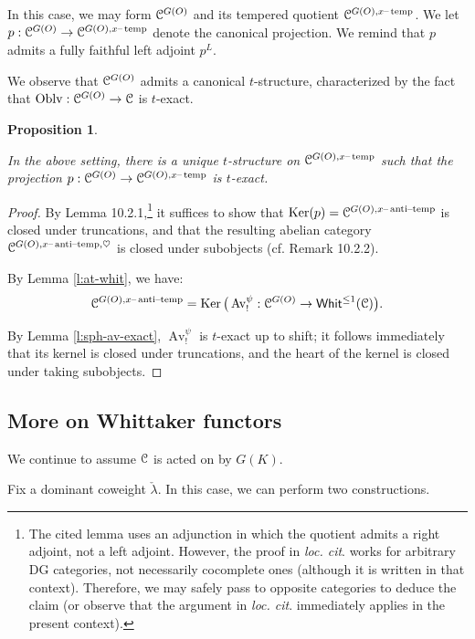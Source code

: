 \documentclass[reqno,11pt]{amsart}
\numberwithin{equation}{subsection}
\newtheorem{prop}[thm]{Proposition}
\theoremstyle{remark}
\newcommand{\sC}{{\EuScript C}}
\newcommand{\on}{\operatorname}
\newcommand{\mathendash}{\text{\textendash}}
\newcommand{\Ker}{\on{Ker}}
\newcommand{\Whit}{\mathsf{Whit}}
\newcommand{\heart}{\heartsuit}
\newcommand{\Oblv}{\on{Oblv}}
\newcommand{\Av}{\on{Av}}
\newcommand{\xat}{x\mathendash\on{anti}\!\mathendash\!\on{temp}}
\newcommand{\xtemp}{x\mathendash\on{temp}}
\begin{document}
In this case, we may form $\sC^{G(O)}$ and its tempered quotient
$\sC^{G(O),\xtemp}$. We let $p:\sC^{G(O)} \to \sC^{G(O),\xtemp}$ denote
the canonical projection. We remind that $p$ admits a fully faithful
left adjoint $p^L$.

We observe that $\sC^{G(O)}$ admits a canonical $t$-structure,
characterized by the fact that $\Oblv:\sC^{G(O)} \to \sC$ is $t$-exact.

\begin{prop}\label{p:temp-t}

In the above setting, there is a unique $t$-structure on 
$\sC^{G(O),\xtemp}$ such that the projection $p:\sC^{G(O)} \to \sC^{G(O),\xtemp}$
is $t$-exact.

\end{prop}

\begin{proof}

By \cite{localization} Lemma 10.2.1,\footnote{The cited lemma uses an adjunction
in which the quotient admits a right adjoint, not a left adjoint. However,
the proof in \emph{loc. cit}. works for arbitrary DG categories, not
necessarily cocomplete ones (although it is written in that context). Therefore,
we may safely pass to opposite categories to deduce the claim
(or observe that the argument in \emph{loc. cit}. immediately applies
in the present context).} it suffices
to show that $\Ker(p) = \sC^{G(O),\xat}$ is closed under truncations, and that
the resulting abelian category $\sC^{G(O),\xat,\heart}$ is closed under 
subobjects (cf. \cite{localization} Remark 10.2.2).

By Lemma \ref{l:at-whit}, we have:
%
\[
\sC^{G(O),\xat} = \Ker\big(\Av_!^{\psi}:\sC^{G(O)} \to \Whit^{\leq 1}(\sC)\big).
\]

\noindent By Lemma \ref{l:sph-av-exact}, $\Av_!^{\psi}$ is $t$-exact up to shift; it 
follows immediately that its kernel is closed under truncations, and the heart of the
kernel is closed under taking subobjects.

\end{proof}

\subsection{More on Whittaker functors}

We continue to assume $\sC$ is acted on by $G(K)$.

Fix a dominant coweight $\check{\lambda}$. In this case,
we can perform two constructions.
\end{document}
